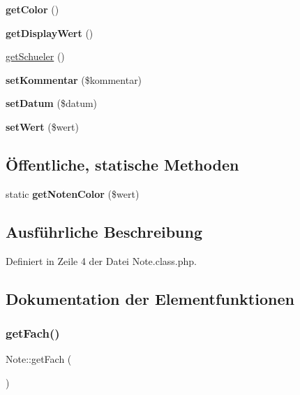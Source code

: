 \begin{DoxyCompactItemize}
{\bfseries get\+Color} ()
\item 
\mbox{\label{class_note_a761b9a44fe1d65496785062931b5fa02}} 
{\bfseries get\+Display\+Wert} ()
\item 
\mbox{\hyperlink{class_note_a4d0b38e7b0436b3b238d20da2e9a9b96}{get\+Schueler}} ()
\item 
\mbox{\label{class_note_a1a57dc1db21fcbf60c70853b76063994}} 
{\bfseries set\+Kommentar} (\$kommentar)
\item 
\mbox{\label{class_note_ae5df6ceafa17a12dd8b6e7c231f2286f}} 
{\bfseries set\+Datum} (\$datum)
\item 
\mbox{\label{class_note_a9f18f46106e1068bc1372873411617ee}} 
{\bfseries set\+Wert} (\$wert)
\end{DoxyCompactItemize}
\subsection*{Öffentliche, statische Methoden}
\begin{DoxyCompactItemize}
\item 
\mbox{\label{class_note_afd2441dadbda26de32188432991bf6fb}} 
static {\bfseries get\+Noten\+Color} (\$wert)
\end{DoxyCompactItemize}


\subsection{Ausführliche Beschreibung}


Definiert in Zeile 4 der Datei Note.\+class.\+php.



\subsection{Dokumentation der Elementfunktionen}
\mbox{\label{class_note_a0775c076ad1e5757cebe6780824402a7}} 
\subsubsection{\texorpdfstring{get\+Fach()}{getFach()}}
{\footnotesize\ttfamily Note\+::get\+Fach (\begin{DoxyParamCaption}{ }\end{DoxyParamCaption})}

